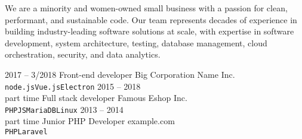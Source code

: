 \documentclass[11pt]{developercv} %
\begin{document}
\begin{minipage}[t]{0.4\textwidth} %
	\vspace{-\baselineskip} %

	We are a minority and women-owned small business with a passion for clean, performant, and sustainable code. Our team represents decades of experience in building industry-leading software solutions at scale, with expertise in software development, system architecture, testing, database management, cloud orchestration, security, and data analytics. %
\end{minipage}
\hfill %
\begin{minipage}[t]{0.5\textwidth} %
	\vspace{-\baselineskip} %

	\begin{barchart}{5.5}
	\end{barchart}
\end{minipage}




\begin{entrylist}
	\entry
		{2017 -- 3/2018}
		{Front-end developer}
		{Big Corporation Name Inc.}
		{\lorem \lorem \lorem\\ \texttt{node.js}\slashsep\texttt{Vue.js}\slashsep\texttt{Electron}}
	\entry
		{2015 -- 2018\\\footnotesize{part time}}
		{Full stack developer}
		{Famous Eshop Inc.}
		{\lorem\lorem\\ \texttt{PHP}\slashsep\texttt{JS}\slashsep\texttt{MariaDB}\slashsep\texttt{Linux}}
	\entry
		{2013 -- 2014\\\footnotesize{part time}}
		{Junior PHP Developer}
		{example.com}
		{\lorem\lorem\\ \texttt{PHP}\slashsep\texttt{Laravel}}
\end{entrylist}
\end{document}
